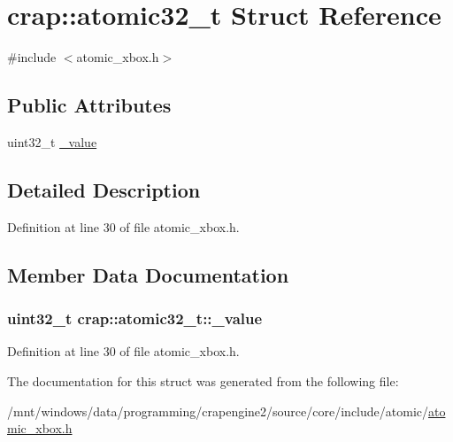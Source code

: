 \hypertarget{structcrap_1_1atomic32__t}{}\section{crap\+:\+:atomic32\+\_\+t Struct Reference}
\label{structcrap_1_1atomic32__t}


{\ttfamily \#include $<$atomic\+\_\+xbox.\+h$>$}

\subsection*{Public Attributes}
\begin{DoxyCompactItemize}
\item 
uint32\+\_\+t \hyperlink{structcrap_1_1atomic32__t_abc3fe1e160a1f6e1337d38e326d3f3f1}{\+\_\+value}
\end{DoxyCompactItemize}


\subsection{Detailed Description}


Definition at line 30 of file atomic\+\_\+xbox.\+h.



\subsection{Member Data Documentation}
\hypertarget{structcrap_1_1atomic32__t_abc3fe1e160a1f6e1337d38e326d3f3f1}{}
\subsubsection[{\+\_\+value}]{\setlength{\rightskip}{0pt plus 5cm}uint32\+\_\+t crap\+::atomic32\+\_\+t\+::\+\_\+value}\label{structcrap_1_1atomic32__t_abc3fe1e160a1f6e1337d38e326d3f3f1}


Definition at line 30 of file atomic\+\_\+xbox.\+h.



The documentation for this struct was generated from the following file\+:\begin{DoxyCompactItemize}
\item 
/mnt/windows/data/programming/crapengine2/source/core/include/atomic/\hyperlink{atomic__xbox_8h}{atomic\+\_\+xbox.\+h}\end{DoxyCompactItemize}

